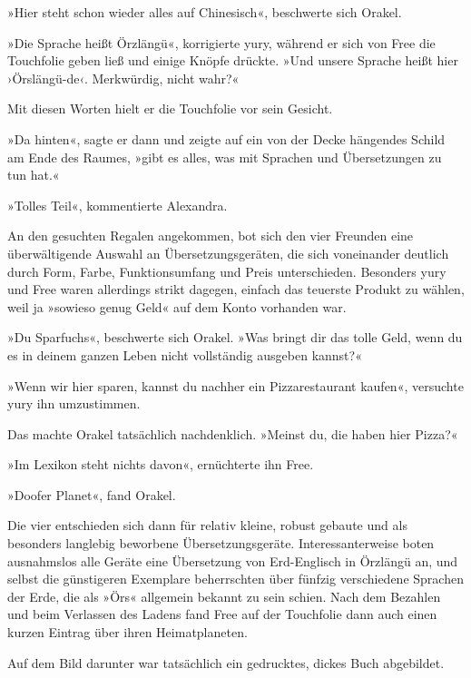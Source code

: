 »Hier steht schon wieder alles auf Chinesisch«, beschwerte sich Orakel.

»Die Sprache heißt Örzlängü«, korrigierte yury, während er sich von Free die Touchfolie geben ließ und einige Knöpfe drückte. »Und unsere Sprache heißt hier ›Örslängü-de‹. Merkwürdig, nicht wahr?«

Mit diesen Worten hielt er die Touchfolie vor sein Gesicht.

»Da hinten«, sagte er dann und zeigte auf ein von der Decke hängendes Schild am Ende des Raumes, »gibt es alles, was mit Sprachen und Übersetzungen zu tun hat.«

»Tolles Teil«, kommentierte Alexandra.

An den gesuchten Regalen angekommen, bot sich den vier Freunden eine überwältigende Auswahl an Übersetzungsgeräten, die sich voneinander deutlich durch Form, Farbe, Funktionsumfang und Preis unterschieden. Besonders yury und Free waren allerdings strikt dagegen, einfach das teuerste Produkt zu wählen, weil ja »sowieso genug Geld« auf dem Konto vorhanden war.

»Du Sparfuchs«, beschwerte sich Orakel. »Was bringt dir das tolle Geld, wenn du es in deinem ganzen Leben nicht vollständig ausgeben kannst?«

»Wenn wir hier sparen, kannst du nachher ein Pizzarestaurant kaufen«, versuchte yury ihn umzustimmen.

Das machte Orakel tatsächlich nachdenklich. »Meinst du, die haben hier Pizza?«

»Im Lexikon steht nichts davon«, ernüchterte ihn Free.

»Doofer Planet«, fand Orakel.

Die vier entschieden sich dann für relativ kleine, robust gebaute und als besonders langlebig beworbene Übersetzungsgeräte. Interessanterweise boten ausnahmslos alle Geräte eine Übersetzung von Erd-Englisch in Örzlängü an, und selbst die günstigeren Exemplare beherrschten über fünfzig verschiedene Sprachen der Erde, die als »Örs« allgemein bekannt zu sein schien. Nach dem Bezahlen und beim Verlassen des Ladens fand Free auf der Touchfolie dann auch einen kurzen Eintrag über ihren Heimatplaneten.


Auf dem Bild darunter war tatsächlich ein gedrucktes, dickes Buch abgebildet.

